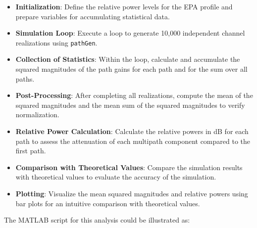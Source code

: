 \documentclass[12pt]{article}
\begin{document}
\begin{itemize}
    \item \textbf{Initialization}: Define the relative power levels for the EPA profile and prepare variables for accumulating statistical data.
    
    \item \textbf{Simulation Loop}: Execute a loop to generate 10,000 independent channel realizations using \texttt{pathGen}.
    
    \item \textbf{Collection of Statistics}: Within the loop, calculate and accumulate the squared magnitudes of the path gains for each path and for the sum over all paths.
    
    \item \textbf{Post-Processing}: After completing all realizations, compute the mean of the squared magnitudes and the mean sum of the squared magnitudes to verify normalization.
    
    \item \textbf{Relative Power Calculation}: Calculate the relative powers in dB for each path to assess the attenuation of each multipath component compared to the first path.
    
    \item \textbf{Comparison with Theoretical Values}: Compare the simulation results with theoretical values to evaluate the accuracy of the simulation.
    
    \item \textbf{Plotting}: Visualize the mean squared magnitudes and relative powers using bar plots for an intuitive comparison with theoretical values.
\end{itemize}
\newline\newline
The MATLAB script for this analysis could be illustrated as:
\end{document}
